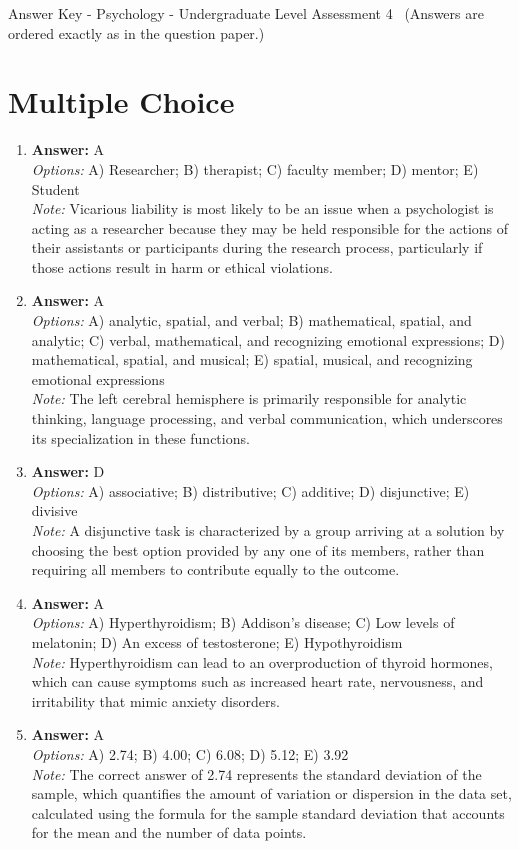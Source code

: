 \documentclass[12pt]{article}
\begin{document}
\begin{center}
Answer Key - Psychology - Undergraduate Level Assessment 4 \
\small (Answers are ordered exactly as in the question paper.)
\end{center}

\section*{Multiple Choice}
\begin{enumerate}[label=\arabic*.]
\item \textbf{Answer:} A
\\ \textit{Options:} A) Researcher; B) therapist; C) faculty member; D) mentor; E) Student
\\ \textit{Note:} Vicarious liability is most likely to be an issue when a psychologist is acting as a researcher because they may be held responsible for the actions of their assistants or participants during the research process, particularly if those actions result in harm or ethical violations.
\item \textbf{Answer:} A
\\ \textit{Options:} A) analytic, spatial, and verbal; B) mathematical, spatial, and analytic; C) verbal, mathematical, and recognizing emotional expressions; D) mathematical, spatial, and musical; E) spatial, musical, and recognizing emotional expressions
\\ \textit{Note:} The left cerebral hemisphere is primarily responsible for analytic thinking, language processing, and verbal communication, which underscores its specialization in these functions.
\item \textbf{Answer:} D
\\ \textit{Options:} A) associative; B) distributive; C) additive; D) disjunctive; E) divisive
\\ \textit{Note:} A disjunctive task is characterized by a group arriving at a solution by choosing the best option provided by any one of its members, rather than requiring all members to contribute equally to the outcome.
\item \textbf{Answer:} A
\\ \textit{Options:} A) Hyperthyroidism; B) Addison's disease; C) Low levels of melatonin; D) An excess of testosterone; E) Hypothyroidism
\\ \textit{Note:} Hyperthyroidism can lead to an overproduction of thyroid hormones, which can cause symptoms such as increased heart rate, nervousness, and irritability that mimic anxiety disorders.
\item \textbf{Answer:} A
\\ \textit{Options:} A) 2.74; B) 4.00; C) 6.08; D) 5.12; E) 3.92
\\ \textit{Note:} The correct answer of 2.74 represents the standard deviation of the sample, which quantifies the amount of variation or dispersion in the data set, calculated using the formula for the sample standard deviation that accounts for the mean and the number of data points.
\end{enumerate}
\end{document}
